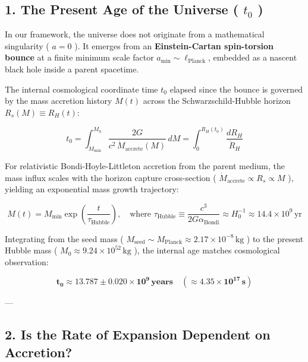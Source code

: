 \documentclass[11pt,a4paper]{article}
\theoremstyle{definition}
\theoremstyle{remark}
\begin{document}
\subsection{1. The Present Age of the Universe ( $t_0$ )}

In our framework, the universe does not originate from a mathematical singularity ( $a=0$ ). It emerges from an \textbf{Einstein-Cartan spin-torsion bounce} at a finite minimum scale factor $a_{\text{min}} \sim \ell_{\text{Planck}}$, embedded as a nascent black hole inside a parent spacetime.

The internal cosmological coordinate time $t_0$ elapsed since the bounce is governed by the mass accretion history $M(t)$ across the Schwarzschild-Hubble horizon $R_s(M) \equiv R_H(t)$:


\begin{equation}
\boxed{t_0 = \int_{M_{\text{min}}}^{M_0} \frac{2G}{c^2 \, \dot{M}_{\text{accrete}}(M)} \, dM = \int_0^{R_H(t_0)} \frac{dR_H}{\dot{R}_H}}
\end{equation}


For relativistic Bondi-Hoyle-Littleton accretion from the parent medium, the mass influx scales with the horizon capture cross-section ( $\dot{M}_{\text{accrete}} \propto R_s \propto M$ ), yielding an exponential mass growth trajectory:


\begin{equation}
M(t) = M_{\text{min}} \exp\left( \frac{t}{\tau_{\text{Hubble}}} \right), \quad \text{where } \tau_{\text{Hubble}} \equiv \frac{c^3}{2G \alpha_{\text{Bondi}}} \approx H_0^{-1} \approx 14.4 \times 10^9 \, \text{yr}
\end{equation}


Integrating from the seed mass ( $M_{\text{seed}} \sim M_{\text{Planck}} \approx 2.17 \times 10^{-8}\,\mathrm{kg}$ ) to the present Hubble mass ( $M_0 \approx 9.24 \times 10^{52}\,\mathrm{kg}$ ), the internal age matches cosmological observation:


\begin{equation}
\mathbf{t_0 \approx 13.787 \pm 0.020 \times 10^9 \, \text{years} \quad (\approx 4.35 \times 10^{17} \, \text{s})}
\end{equation}


---

\subsection{2. Is the Rate of Expansion Dependent on Accretion?}
\end{document}
